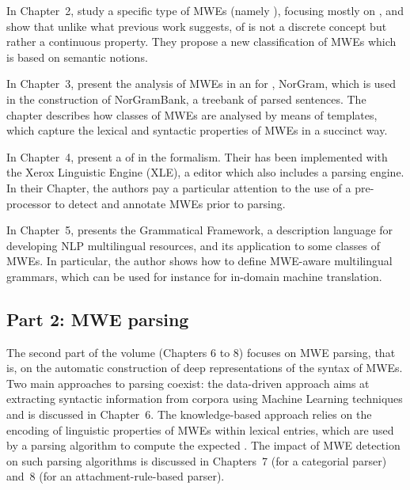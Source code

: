 \documentclass[output=paper]{langsci/langscibook}
\begin{document}
In Chapter~2, %
 study a specific type of MWEs (namely ),
focusing mostly on , and show that unlike what previous work
suggests,  of  is not a discrete concept but
rather a continuous property. They propose a new classification of
MWEs which is based on semantic notions.

In Chapter~3, %
 present the analysis
of MWEs in an   for , NorGram, which is used in the
construction of NorGramBank, a treebank of parsed sentences. The
chapter describes how classes of MWEs are analysed by means of 
templates, which capture the lexical and syntactic properties of MWEs
in a succinct way.

In Chapter~4, %
 present a
 of  in the  formalism. Their  has been
implemented with the Xerox Linguistic Engine (XLE), a  editor
which also includes a parsing engine. In their Chapter, the authors
pay a particular attention to the use of a pre-processor to detect and
annotate MWEs prior to parsing.

In Chapter~5, %
 presents the Grammatical Framework, a
description language for developing NLP multilingual resources, and
its application to some classes of MWEs. In particular, the author
shows how to define MWE-aware multilingual grammars, which can be used
for instance for in-domain machine translation.

\subsection*{Part 2: MWE parsing}

The second part of the volume (Chapters 6 to 8) focuses on MWE
parsing, that is, on the automatic construction of deep
representations of the syntax of MWEs. Two main approaches to parsing
coexist: the data-driven approach aims at extracting syntactic
information from corpora using Machine Learning techniques and is
discussed in Chapter~6. The knowledge-based approach relies on the
encoding of linguistic properties of MWEs within lexical entries,
which are used by a parsing algorithm to compute the
expected . The impact of MWE detection on
such parsing algorithms is discussed in Chapters~7 (for a categorial
parser) and~8 (for an attachment-rule-based parser).
\end{document}
